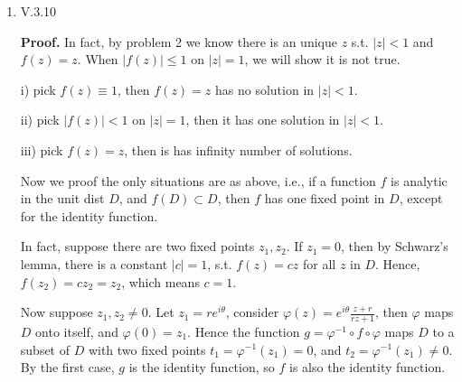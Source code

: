 \documentclass{article}%
\begin{document}
\begin{enumerate}
\item V.3.10

\textbf{Proof.} In fact, by problem 2 we know there is an unique $z$ s.t. $|z| < 1$ and $f(z) = z$. When $|f(z)| \le 1$ on $|z| = 1$, we will show it is not true.

i) pick $f(z) \equiv 1$, then $f(z) = z$ has no solution in $|z| < 1$.

ii) pick $|f(z)| < 1$ on $|z| = 1$, then it has one solution in $|z| < 1$.

iii) pick $f(z) = z$, then is has infinity number of solutions.

Now we proof the only situations are as above, i.e., if a function $f$ is analytic in the unit dist $D$, and $f(D)\subset D$, then $f$ has one fixed point in $D$, except for the identity function.

In fact, suppose there are two fixed points $z_1, z_2 $. If $z_1 = 0$, then by Schwarz's lemma, there is a constant $|c| = 1$, s.t. $f(z) = cz$ for all $z$ in $D$. Hence, $f(z_2) = cz_2 = z_2 $, which means $c = 1$.

Now suppose $z_1, z_2\ne 0 $. Let $z_1 = re^{i\theta} $, consider $\varphi(z) = e^{i\theta}\frac{z+r}{rz+1}$, then $\varphi$ maps $D$ onto itself, and $\varphi(0) = z_1 $. Hence the function $g = \varphi^{-1} \circ f\circ\varphi$ maps $D$ to a subset of $D$ with two fixed points $t_1 = \varphi^{-1}(z_1) = 0 $, and $t_2 = \varphi^{-1}(z_1) \ne 0 $. By the first case, $g$ is the identity function, so $f$ is also the identity function.

\end{enumerate}
\end{document}

